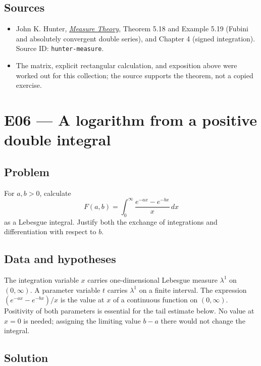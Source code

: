 \documentclass[
  11pt,
]{article}
\providecommand{\tightlist}{%
  \setlength{\itemsep}{0pt}\setlength{\parskip}{0pt}}
\begin{document}
\subsection{Sources}\label{sources-4}

\begin{itemize}
\tightlist
\item
  John K. Hunter,
  \href{https://www.math.ucdavis.edu/~hunter/measure_theory/measure_notes.pdf}{\emph{Measure
  Theory}}, Theorem 5.18 and Example 5.19 (Fubini and absolutely
  convergent double series), and Chapter 4 (signed integration). Source
  ID: \texttt{hunter-\allowbreak{}measure}.
\item
  The matrix, explicit rectangular calculation, and exposition above
  were worked out for this collection; the source supports the theorem,
  not a copied exercise.
\end{itemize}

\section{E06 --- A logarithm from a positive double integral}\label{E06}

\subsection{Problem}\label{problem-5}

For \(a,b>0\), calculate \[
F(a,b)=\int_0^{\infty}\frac{e^{-ax}-e^{-bx}}{x}\,dx
\] as a Lebesgue integral. Justify both the exchange of integrations and
differentiation with respect to \(b\).

\subsection{Data and hypotheses}\label{data-and-hypotheses-5}

The integration variable \(x\) carries one-dimensional Lebesgue measure
\(\lambda^1\) on \((0,\infty)\). A parameter variable \(t\) carries
\(\lambda^1\) on a finite interval. The expression
\((e^{-ax}-e^{-bx})/x\) is the value at \(x\) of a continuous function
on \((0,\infty)\). Positivity of both parameters is essential for the
tail estimate below. No value at \(x=0\) is needed; assigning the
limiting value \(b-a\) there would not change the integral.

\subsection{Solution}\label{solution-5}
\end{document}
